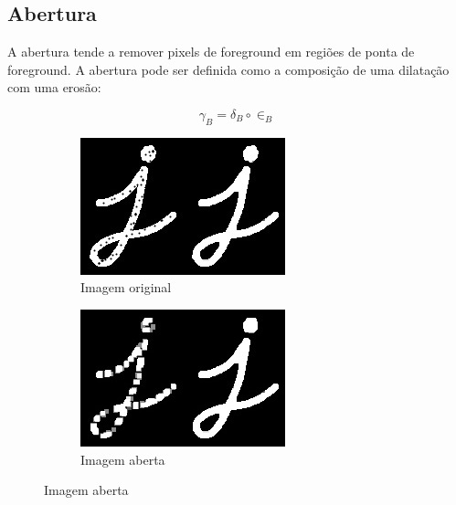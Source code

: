 \documentclass[10pt,a4paper]{article}
\begin{document}
\subsection{Abertura}
A abertura tende a remover pixels de foreground em regiões de ponta de foreground. A abertura pode ser definida como a composição de uma dilatação com uma erosão:

\begin{equation}
    \gamma_B = \delta_B \circ \in_B
\end{equation}

\begin{figure}[!ht]
    \centering
    \begin{subfigure}[ht]{0.45\textwidth}
        \includegraphics[width=\textwidth]{src.jpg}
        \caption{Imagem original}
    \end{subfigure}
    \qquad
    \begin{subfigure}[ht]{0.45\textwidth}
        \includegraphics[width=\textwidth]{opening.jpg}
        \caption{Imagem aberta}
    \end{subfigure}
    \label{fig:opening}
\end{figure}
\end{document}

